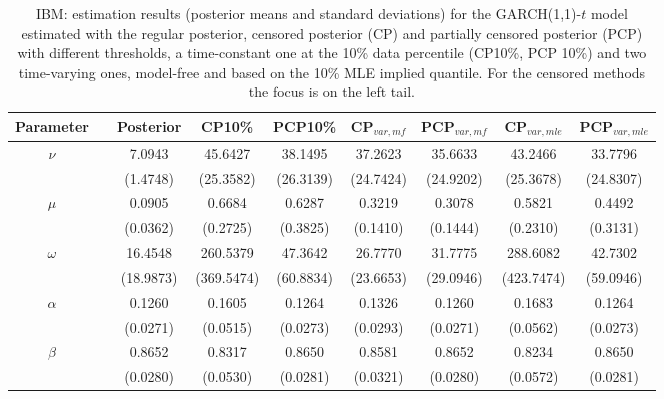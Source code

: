 { \renewcommand{\arraystretch}{1.2} 
\begin{table} 
\center 
\begin{tabular}{cc ccccccc} 
Parameter & & Posterior & CP10\% & PCP10\%  & CP$_{var,mf}$ & PCP$_{var,mf}$ & CP$_{var,mle}$ & PCP$_{var,mle}$ \\ \hline 
\rowcolor{LightCyan} 
$\nu$&& 7.0943 & 45.6427 & 38.1495 & 37.2623 & 35.6633 & 43.2466 & 33.7796 \\ 
&&    (1.4748) & (25.3582) & (26.3139)  & (24.7424) & (24.9202) & (25.3678) & (24.8307)  \\ 
\rowcolor{LightCyan} 
$\mu$&& 0.0905 & 0.6684 & 0.6287 & 0.3219 & 0.3078 & 0.5821 & 0.4492 \\ 
&&    (0.0362) & (0.2725) & (0.3825)  & (0.1410) & (0.1444) & (0.2310) & (0.3131)  \\ 
\rowcolor{LightCyan} 
$\omega$&& 16.4548 & 260.5379 & 47.3642 & 26.7770 & 31.7775 & 288.6082 & 42.7302 \\ 
&&    (18.9873) & (369.5474) & (60.8834)  & (23.6653) & (29.0946) & (423.7474) & (59.0946)  \\ 
\rowcolor{LightCyan} 
$\alpha$&& 0.1260 & 0.1605 & 0.1264 & 0.1326 & 0.1260 & 0.1683 & 0.1264 \\ 
&&    (0.0271) & (0.0515) & (0.0273)  & (0.0293) & (0.0271) & (0.0562) & (0.0273)  \\ 
\rowcolor{LightCyan} 
$\beta$&& 0.8652 & 0.8317 & 0.8650 & 0.8581 & 0.8652 & 0.8234 & 0.8650 \\ 
&&    (0.0280) & (0.0530) & (0.0281)  & (0.0321) & (0.0280) & (0.0572) & (0.0281)  \\ 
\hline 
\end{tabular}
 \caption{IBM: estimation results (posterior means and standard deviations)  for the GARCH(1,1)-$t$ model estimated with the regular posterior, censored posterior (CP) and partially censored posterior (PCP) with different thresholds,  a time-constant one at the 10\% data percentile (CP10\%, PCP 10\%) and two time-varying ones, model-free and based on the 10\% MLE implied quantile. 
For the censored methods the focus is on the left tail. }
\label{tab:IBM_estim}  
\end{table}
}